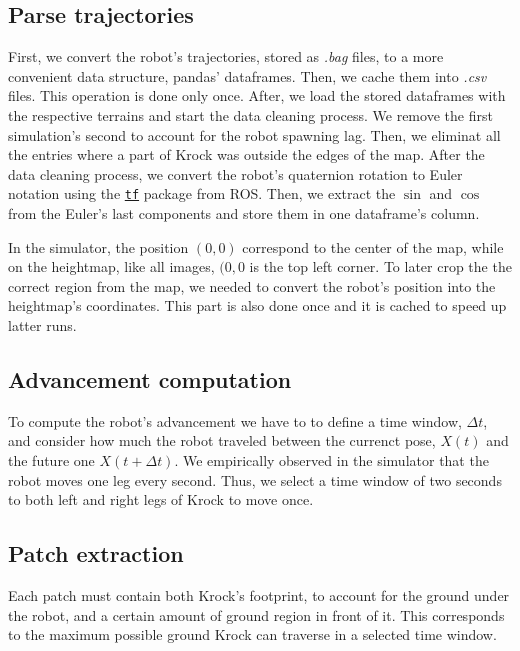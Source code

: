 \documentclass[../document.tex]{subfiles}
\begin{document}
\subsection{Parse trajectories}
First, we convert the robot's trajectories, stored as \emph{.bag} files, to a more convenient data structure, pandas' dataframes. Then, we cache them into \emph{.csv} files. This operation is done only once.
After, we load the stored dataframes with the respective terrains and start the data cleaning process. We remove the first simulation's second to account for the robot spawning lag. Then, we eliminat all the entries where a part of Krock was outside the edges of the map. After the data cleaning process, we convert the robot's quaternion rotation to Euler notation using the \href{https://duckduckgo.com/?q=ros+tf&atb=v154-1__&ia=web}{\texttt{tf}} package from ROS. Then, we extract the $\sin$ and $\cos$ from the Euler's last components and store them in one dataframe's column.

In the simulator, the position $(0,0)$ correspond to the center of the map, while on the heightmap, like all images, $(0,0$ is the top left corner. To later crop the the correct region from the map, we needed to convert the robot's position into the heightmap's coordinates. This part is also done once and it is cached to speed up latter runs.

\subsection{Advancement computation}
To compute the robot's advancement we have to to define a time window, $\Delta t$, and consider how much the robot traveled between the currenct pose, $X(t)$ and the future one $X(t + \Delta t)$. We empirically observed in the simulator that the robot moves one leg every second. Thus, we select a time window of two seconds to both left and right legs of Krock to move once.

\subsection{Patch extraction}
Each patch must contain both Krock's footprint, to account for the ground under the robot, and a certain amount of ground region in front of it. This corresponds to the maximum possible ground Krock can traverse in a selected time window.  
\end{document}
